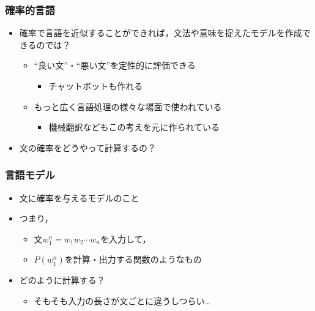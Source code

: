 \documentclass[14pt]{beamer}
\begin{document}
\begin{frame}
	\frametitle{確率的言語}

	\begin{itemize}
		\item 確率で言語を近似することができれば，文法や意味を捉えたモデルを作成できるのでは？
			\begin{itemize}
				\item ``良い文''・``悪い文''を定性的に評価できる
					\begin{itemize}
						\item チャットボットも作れる
					\end{itemize}
				\item もっと広く言語処理の様々な場面で使われている
					\begin{itemize}
						\item 機械翻訳などもこの考えを元に作られている
					\end{itemize}
			\end{itemize}
		\item 文の確率をどうやって計算するの？
	\end{itemize}
\end{frame}

\begin{frame}
	\frametitle{言語モデル}

	\begin{itemize}
		\item 文に確率を与えるモデルのこと
		\item つまり，
			\begin{itemize}
				\item 文$w_1^n = w_1 w_2 \cdots w_n$を入力して，
				\item $P(w_1^n)$を計算・出力する関数のようなもの
			\end{itemize}
		\item どのように計算する？
			\begin{itemize}
				\item そもそも入力の長さが文ごとに違うしつらい…
			\end{itemize}
	\end{itemize}
\end{frame}
\end{document}
